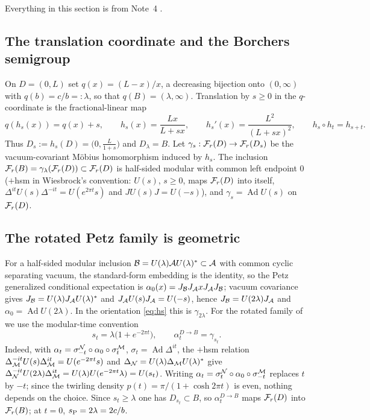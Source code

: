\label{sec:petz}
Everything in this section is from Note~4 \cite{Note4}.

\subsection{The translation coordinate and the Borchers semigroup}
On $D=(0,L)$ set $q(x)=(L-x)/x$, a decreasing bijection onto $(0,\infty)$ with
$q(b)=c/b=:\lambda$, so that $q(B)=(\lambda,\infty)$.  Translation by $s\ge0$ in
the $q$-coordinate is the fractional-linear map
\begin{equation}\label{eq:hs}
 q(h_s(x))=q(x)+s,\qquad
 h_s(x)=\frac{Lx}{L+sx},\qquad
 h_s'(x)=\frac{L^2}{(L+sx)^2},\qquad h_s\circ h_t=h_{s+t}.
\end{equation}
Thus $D_s:=h_s(D)=\bigl(0,\tfrac L{1+s}\bigr)$ and $D_\lambda=B$.  Let
$\gamma_s:\mathcal F_r(D)\to\mathcal F_r(D_s)$ be the vacuum-covariant M\"obius homomorphism
induced by $h_s$.  The inclusion
$\mathcal F_r(B)=\gamma_\lambda(\mathcal F_r(D))\subset\mathcal F_r(D)$ is half-sided modular with
common left endpoint $0$ ($+$hsm in Wiesbrock's convention: $U(s)$, $s\ge0$, maps
$\mathcal F_r(D)$ into itself, $\Delta^{it}U(s)\Delta^{-it}=U(e^{2\pi t}s)$ and
$JU(s)J=U(-s)$), and $\gamma_s=\operatorname{Ad}U(s)$ on $\mathcal F_r(D)$.

\subsection{The rotated Petz family is geometric}
For a half-sided modular inclusion $\mathcal B=U(\lambda)\mathcal A U(\lambda)^*\subset\mathcal A$ with
common cyclic separating vacuum, the standard-form embedding is the identity, so
the Petz generalized conditional expectation is
$\alpha_0(x)=J_{\mathcal B}J_{\mathcal A}xJ_{\mathcal A}J_{\mathcal B}$; vacuum covariance gives
$J_{\mathcal B}=U(\lambda)J_{\mathcal A}U(\lambda)^*$ and $J_{\mathcal A}U(s)J_{\mathcal A}=U(-s)$, hence
$J_{\mathcal B}=U(2\lambda)J_{\mathcal A}$ and $\alpha_0=\operatorname{Ad}U(2\lambda)$.  In the
orientation \eqref{eq:hs} this is $\gamma_{2\lambda}$.  For the rotated family of
\cite[Sec.~4.2]{FHSW} we use the modular-time convention
\begin{equation}\label{eq:st}
 \boxed{\;s_t=\lambda\bigl(1+e^{-2\pi t}\bigr),\qquad
 \alpha^{D\to B}_t=\gamma_{s_t}.\;}
\end{equation}
Indeed, with $\alpha_t=\sigma^{\mathcal N}_{-t}\circ\alpha_0\circ\sigma^{\mathcal M}_{t}$,
$\sigma_t=\operatorname{Ad}\Delta^{it}$, the $+$hsm relation
$\Delta_{\mathcal M}^{-it}U(s)\Delta_{\mathcal M}^{it}=U(e^{-2\pi t}s)$ and
$\Delta_{\mathcal N}=U(\lambda)\Delta_{\mathcal M}U(\lambda)^*$ give
$\Delta_{\mathcal N}^{-it}U(2\lambda)\Delta_{\mathcal M}^{it}
=U(\lambda)U(e^{-2\pi t}\lambda)=U(s_t)$.  Writing
$\alpha_t=\sigma^{\mathcal N}_{t}\circ\alpha_0\circ\sigma^{\mathcal M}_{-t}$ replaces $t$ by
$-t$; since the twirling density $p(t)=\pi/(1+\cosh2\pi t)$ is even, nothing
depends on the choice.  Since $s_t\ge\lambda$ one has $D_{s_t}\subset B$, so
$\alpha_t^{D\to B}$ maps $\mathcal F_r(D)$ into $\mathcal F_r(B)$; at $t=0$,
$s_{\rm P}=2\lambda=2c/b$.

